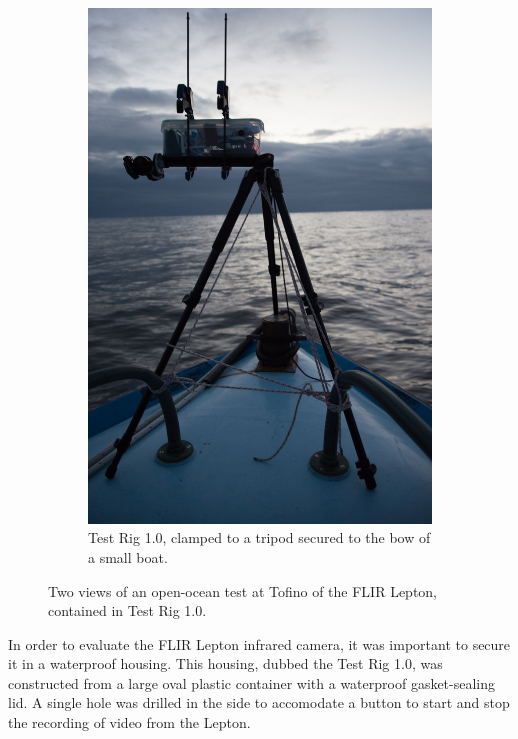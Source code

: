 \begin{figure}
\begin{subfigure}{.35\textwidth}
  \includegraphics[width=.95\linewidth]{"./image/20150219-_BEN2655"}
  \caption{Test Rig 1.0, clamped to a tripod secured to the bow of a small boat.}
  \label{fig:test_rig_1.0_tofino:sub2}
\end{subfigure}
\caption[Test Rig 1.0 open-ocean test.]{Two views of an open-ocean test at Tofino of the FLIR Lepton, contained in Test Rig 1.0.}
\label{fig:test_rig_1.0_tofino}
\end{figure}

In order to evaluate the FLIR Lepton infrared camera, it was important to secure it in a waterproof housing. This housing, dubbed the Test Rig 1.0, was constructed from a large oval plastic container with a waterproof gasket-sealing lid. A single hole was drilled in the side to accomodate a button to start and stop the recording of video from the Lepton.

